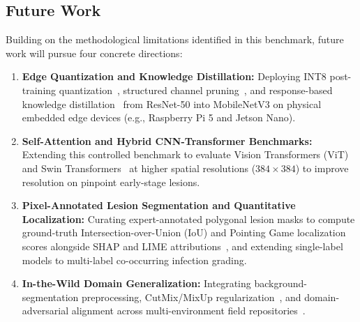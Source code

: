 \documentclass[journal]{IEEEtran}
\begin{document}
\subsection{Future Work}
\label{sec:future_work}
Building on the methodological limitations identified in this benchmark, future work will pursue four concrete directions:
\begin{enumerate}
    \item \textbf{Edge Quantization and Knowledge Distillation:} Deploying INT8 post-training quantization~\cite{jacob2018}, structured channel pruning~\cite{han2015, liu2017}, and response-based knowledge distillation~\cite{hinton2015, sze2017} from ResNet-50 into MobileNetV3 on physical embedded edge devices (e.g., Raspberry Pi 5 and Jetson Nano).
    \item \textbf{Self-Attention and Hybrid CNN-Transformer Benchmarks:} Extending this controlled benchmark to evaluate Vision Transformers (ViT) and Swin Transformers~\cite{vaswani2017} at higher spatial resolutions ($384 \times 384$) to improve resolution on pinpoint early-stage lesions.
    \item \textbf{Pixel-Annotated Lesion Segmentation and Quantitative Localization:} Curating expert-annotated polygonal lesion masks to compute ground-truth Intersection-over-Union (IoU) and Pointing Game localization scores alongside SHAP and LIME attributions~\cite{xai2026review}, and extending single-label models to multi-label co-occurring infection grading.
    \item \textbf{In-the-Wild Domain Generalization:} Integrating background-segmentation preprocessing, CutMix/MixUp regularization~\cite{shorten2019}, and domain-adversarial alignment across multi-environment field repositories~\cite{singh2020, ahmad2023, lu2024frontiers}.
\end{enumerate}
\end{document}
